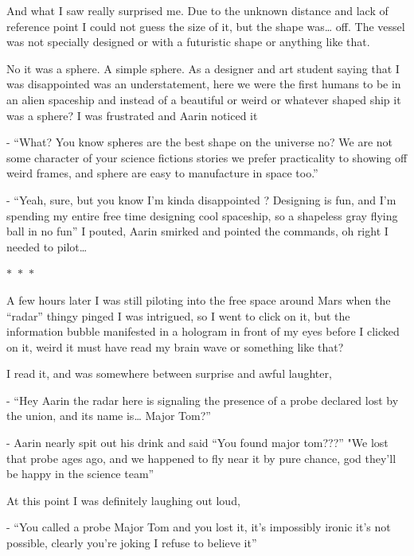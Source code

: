 \documentclass[colorlinks,12pt,a4paper]{book}
\newcommand\sep{\begin{center}
  \boldmath $\ast$~$\ast$~$\ast$
\end{center}}
\begin{document}
And what I saw really surprised me. Due to the unknown distance and lack of reference point I could not 
guess the size of it, but the shape was… off. The vessel was not specially designed or with a futuristic 
shape or anything like that.\par
\bigskip

No it was a sphere. A simple sphere. As a designer and art student saying that I was disappointed was an understatement, 
here we were the first humans to be in an alien spaceship and instead of a beautiful or weird or whatever shaped 
ship it was a sphere? I was frustrated and Aarin noticed it\par
\bigskip

- “What? You know spheres are the best shape on the universe no? We are not some character of your 
science fictions stories we prefer practicality to showing off weird frames, 
and sphere are easy to manufacture in space too.”\par
\bigskip

- “Yeah, sure, but you know I'm kinda disappointed ? Designing is fun, and I'm 
spending my entire free time designing cool spaceship, so a shapeless gray flying ball in no fun” I pouted, 
Aarin smirked and pointed the commands, oh right I needed to pilot…

\sep

A few hours later I was still piloting into the free space around Mars when the “radar” thingy pinged I was intrigued,
so I went to click on it, but the information bubble manifested in a hologram in front of my eyes before I clicked on it, 
weird it must have read my brain wave or something like that? \par
\bigskip

I read it, and was somewhere between surprise and awful laughter,\par
\bigskip

- “Hey Aarin the radar here is signaling the presence of a probe declared lost by the union, and its name is… Major Tom?”\par
\bigskip

- Aarin nearly spit out his drink and said “You found major tom???” "We lost that probe ages ago, 
and we happened to fly near it by pure chance, god they'll be happy in the science team”\par
\bigskip

At this point I was definitely laughing out loud,\par
\bigskip

- “You called a probe Major Tom and you lost it, it's impossibly ironic it's not possible, 
clearly you're joking I refuse to believe it”\par
\bigskip
\end{document}
